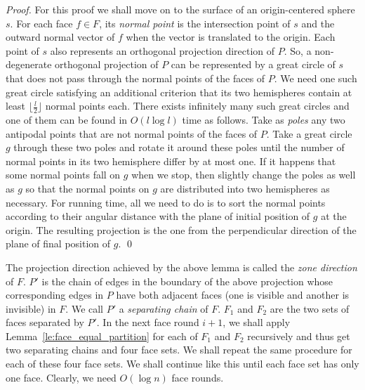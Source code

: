 \documentclass{llncs}
\begin{document}
\begin{proof}
For this proof we shall move on to the surface of an origin-centered sphere $s$.
For each face $f\in F$, its  \emph{normal point} is the intersection point of $s$ 
and the outward normal vector of $f$ when the vector is translated to the origin.
Each point of $s$ also represents an orthogonal projection direction of $P$.
So, a non-degenerate orthogonal projection of $P$ can be represented 
by a great circle of $s$ that does not pass through the normal points of the faces of $P$.
We need one such great circle satisfying an additional criterion that its two hemispheres contain 
at least $\lfloor\frac{l}{2}\rfloor$ normal points each.
There exists infinitely many such great circles and one of them can be found in $O(l\log l)$ time
as follows. 
Take as \emph{poles} any two antipodal points that are not normal points of the faces of $P$.
Take a great circle $g$ through these two poles and rotate it around these poles until 
the number of normal points in its two hemisphere differ by at most one.
If it happens that some normal points fall on $g$ when we stop,
then slightly change the poles as well as $g$ so that the normal points on $g$ are distributed into two hemispheres as necessary.
For running time, all we need to do is to sort the normal points according to their angular distance 
with the plane of initial position of $g$ at the origin.
The resulting projection is the one from the perpendicular direction of the plane of final position of $g$.
\qed
\end{proof}

The projection direction achieved by the above lemma is called the \emph{zone direction} of $F$.
$P'$ is the chain of edges in the boundary of the above projection
whose corresponding edges in $P$ have both adjacent faces (one is visible and another is invisible) in $F$.
We call $P'$ a \emph{separating chain} of $F$.
$F_1$ and $F_2$ are the two sets of faces separated by $P'$.
In the next face round $i+1$, we shall apply Lemma~\ref{le:face_equal_partition} for each of $F_1$ and $F_2$
recursively and thus get two separating chains and four  face sets.
We shall repeat the same procedure for each of these four face sets.
We shall continue like this until each face set has only one face.
Clearly, we need $O(\log n)$ face rounds.
\end{document}
